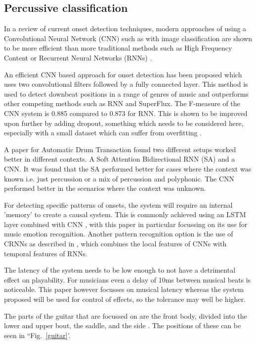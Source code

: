 \documentclass[conference]{IEEEtran}
\begin{document}
\subsection{Percussive classification}

In a review of current onset detection techniques, modern approaches of using a Convolutional Neural Network (CNN) such as with image classification are shown to be more efficient than 
more traditional methods such as High Frequency Content or Recurrent Neural Networks (RNNs) \cite{b2}.

An efficient CNN based approach for onset detection has been proposed \cite{b1} which uses two convolutional filters followed by a fully connected layer. This method is used to detect
downbeat positions in a range of genres of music and outperforms other competing methods such as RNN and SuperFlux. The F-measure of the CNN system is 0.885 compared to 0.873 for RNN. This
is shown to be improved upon further by adding dropout, something which needs to be considered here, especially with a small dataset which can suffer from overfitting \cite{b8}.

A paper for Automatic Drum Transaction found two different setups worked better in different contexts. A Soft Attention Bidirectional RNN (SA) and a CNN. It was found that the SA performed
better for cases where the context was known i.e. just percussion or a mix of percussion and polyphonic. The CNN performed better in the scenarios where the context was unknown.

For detecting specific patterns of onsets, the system will require an internal 'memory' to create a causal system. This is commonly achieved using an LSTM layer combined with CNN \cite{b6}, with this paper in
particular focussing on its use for music emotion recognition. Another pattern recognition option is the use of CRNNs as described in \cite{b7}, which combines the local features of CNNs with temporal features of RNNs.

The latency of the system needs to be low enough to not have a detrimental effect on playability. For musicians even a delay of 10ms between musical beats \cite{b4} is noticeable. This paper however
focusses on musical latency whereas the system proposed will be used for control of effects, so the tolerance may well be higher.

The parts of the guitar that are focussed on are the front body, divided into the lower and upper bout, the saddle, and the side \cite{b3}. The positions of these can be seen in ``Fig.~\ref{guitar}'.
\end{document}
